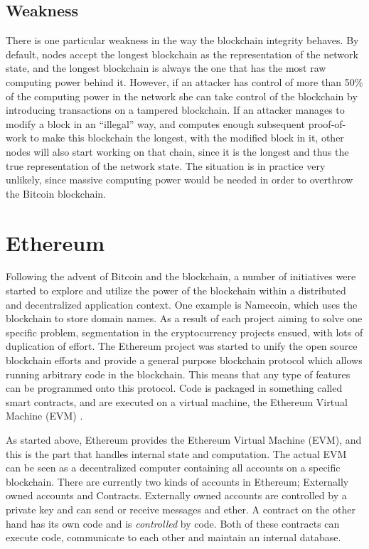 \subsection{Weakness}
There is one particular weakness in the way the blockchain integrity behaves. By default, nodes accept the longest blockchain as the representation of the network state, and the longest blockchain is always the one that has the most raw computing power behind it. However, if an attacker has control of more than 50\% of the computing power in the network she can take control of the blockchain by introducing transactions on a tampered blockchain. If an attacker manages to modify a block in an ``illegal'' way, and computes enough subsequent proof-of-work to make this blockchain the longest, with the modified block in it, other nodes will also start working on that chain, since it is the longest and thus the true representation of the network state. The situation is in practice very unlikely, since massive computing power would be needed in order to overthrow the Bitcoin blockchain.

\section{Ethereum}
Following the advent of Bitcoin and the blockchain, a number of initiatives were started to explore and utilize the power of the blockchain within a distributed and decentralized application context. One example is Namecoin, which uses the blockchain to store domain names. As a result of each project aiming to solve one specific problem, segmentation in the cryptocurrency projects ensued, with lots of duplication of effort. The Ethereum project was started to unify the open source blockchain efforts and provide a general purpose blockchain protocol which allows running arbitrary code in the blockchain. This means that any type of features can be programmed onto this protocol. Code is packaged in something called smart contracts, and are executed on a virtual machine, the Ethereum Virtual Machine (EVM) \cite{ethereum:quote}.

As started above, Ethereum provides the Ethereum Virtual Machine (EVM), and this is the part that handles internal state and computation. The actual EVM can be seen as a decentralized computer containing all accounts on a specific blockchain. There are currently two kinds of accounts in Ethereum; Externally owned accounts and Contracts. Externally owned accounts are controlled by a private key and can send or receive messages and ether. A contract on the other hand has its own code and is \emph{controlled} by code. Both of these contracts can execute code, communicate to each other and maintain an internal database. 


